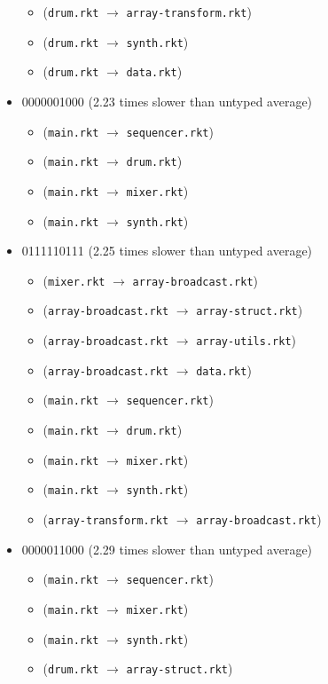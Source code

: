 \documentclass{article}
\newcommand{\mono}[1]{\texttt{#1}}
\begin{document}
\begin{itemize}
\begin{itemize}
  \item (\mono{drum.rkt} $\rightarrow$ \mono{array-transform.rkt})
  \item (\mono{drum.rkt} $\rightarrow$ \mono{synth.rkt})
  \item (\mono{drum.rkt} $\rightarrow$ \mono{data.rkt})
  \end{itemize}
\item 0000001000 (2.23 times slower than untyped average)
  \begin{itemize}
  \item (\mono{main.rkt} $\rightarrow$ \mono{sequencer.rkt})
  \item (\mono{main.rkt} $\rightarrow$ \mono{drum.rkt})
  \item (\mono{main.rkt} $\rightarrow$ \mono{mixer.rkt})
  \item (\mono{main.rkt} $\rightarrow$ \mono{synth.rkt})
  \end{itemize}
\item 0111110111 (2.25 times slower than untyped average)
  \begin{itemize}
  \item (\mono{mixer.rkt} $\rightarrow$ \mono{array-broadcast.rkt})
  \item (\mono{array-broadcast.rkt} $\rightarrow$ \mono{array-struct.rkt})
  \item (\mono{array-broadcast.rkt} $\rightarrow$ \mono{array-utils.rkt})
  \item (\mono{array-broadcast.rkt} $\rightarrow$ \mono{data.rkt})
  \item (\mono{main.rkt} $\rightarrow$ \mono{sequencer.rkt})
  \item (\mono{main.rkt} $\rightarrow$ \mono{drum.rkt})
  \item (\mono{main.rkt} $\rightarrow$ \mono{mixer.rkt})
  \item (\mono{main.rkt} $\rightarrow$ \mono{synth.rkt})
  \item (\mono{array-transform.rkt} $\rightarrow$ \mono{array-broadcast.rkt})
  \end{itemize}
\item 0000011000 (2.29 times slower than untyped average)
  \begin{itemize}
  \item (\mono{main.rkt} $\rightarrow$ \mono{sequencer.rkt})
  \item (\mono{main.rkt} $\rightarrow$ \mono{mixer.rkt})
  \item (\mono{main.rkt} $\rightarrow$ \mono{synth.rkt})
  \item (\mono{drum.rkt} $\rightarrow$ \mono{array-struct.rkt})

\end{itemize}
\end{itemize}
\end{document}
